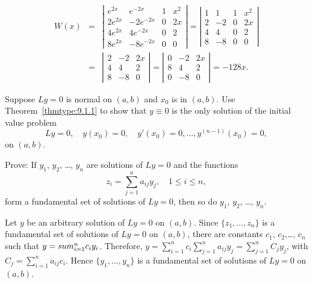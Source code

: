 \documentclass{ximera}
\begin{document}
\begin{problem}
\begin{enumerate}
\begin{solution}
\begin{eqnarray*}
W(x)&=&\left|\begin{array}{crcc}
e^{2x}&e^{-2x}&1&x^2\\
2e^{2x}&-2e^{-2x}&0&2x\\
4e^{2x}&4e^{-2x}&0&2\\
8e^{2x}&-8e^{-2x}&0&0
\end{array}\right|=
\left|\begin{array}{crcc}
1&1&1&x^2\\
2&-2&0&2x\\
4&4&0&2\\
8&-8&0&0
\end{array}\right|\\
&=&\left|\begin{array}{crcc}
2&-2&2x\\
4&4&2\\
8&-8&0
\end{array}\right|
=\left|\begin{array}{crcc}
0&-2&2x\\
8&4&2\\
0&-8&0
\end{array}\right|=-128x.
\end{eqnarray*}
\end{solution}
\end{enumerate}
\end{problem}

\begin{problem}\label{exer:9.1.11}
Suppose $Ly=0$ is normal on $(a,b)$ and $x_0$ is in $(a,b)$. Use
Theorem~\ref{thmtype:9.1.1} to show that $y\equiv0$ is the only solution
of the initial value problem
$$
Ly=0, \quad  y(x_0)=0,\quad y'(x_0)=0,\dots, y^{(n-1)}(x_0)=0,
$$
on $(a,b)$.
\end{problem}

\begin{problem}\label{exer:9.1.12}
Prove:  If $y_1$, $y_2$, \dots, $y_n$ are solutions of $Ly=0$ and the
functions
$$
z_i=\sum^n_{j=1}a_{ij}y_j,\quad 1\le i\le n,
$$
form a fundamental set of solutions of $Ly=0$, then so do $y_1$, $y_2$,
\dots, $y_n$.

\begin{solution}
Let $y$ be an arbitrary solution of $Ly=0$ on $(a,b)$. Since
$\{z_1,\dots,z_n\}$ is a fundamental set of solutions of $Ly=0$
on $(a,b)$, there are constants $c_1$, $c_2$,\dots, $c_n$
such that $y=\\sum_{i=1}^nc_iy_i$. Therefore,
$y=\sum_{i=1}^nc_i\sum_{j=1}^n a_{ij}y_j=\sum_{j=1}^n C_jy_j$,
with $C_j=\sum_{i=1}^na_{ij}c_i$.
Hence $\{y_1,\dots,y_n\}$ is a fundamental set of solutions of
$Ly=0$ on $(a,b)$.
\end{solution}
\end{problem}
\end{document}

